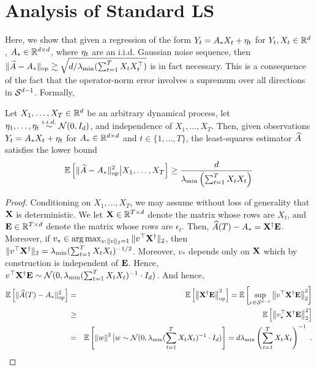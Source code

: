 \section{Analysis of Standard LS\label{app:op_norm_ls}}
Here, we show that given a regression of the form $Y_t = A_{*} X_t + \eta_t$ for $Y_t,X_t \in \mathbb{R}^d$, $A_{*} \in \mathbb{R}^{d \times d}$, where $\eta_t$ are an i.i.d. Gaussian noise sequence, then $\|\widehat{A} - A_{*}\|_{\mathrm{op}} \gtrsim \sqrt{d/ \lambda_{\min}(\sum_{t=1}^T X_tX_t^\top)}$ is in fact necessary. This is a consequence of the fact that the operator-norm error involves a supremum over all directions in $\mathcal{S}^{d-1}$. Formally,
\begin{thm}\label{thm:alg_spec_lb} Let $X_1,\dots,X_T \in \mathbb{R}^d$ be an arbitrary dynamical process, let $\eta_1,\dots,\eta_t \overset{i.i.d.}{\sim} \mathcal{N}(0,I_d)$, and independence of $X_1,\dots,X_T$. Then, given observations $Y_t = A_{*} X_t + \eta_t$ for $A_{*} \in \mathbb{R}^{d\times d}$ and $t \in \{1,\dots,T\}$, the least-squares estimator $\widehat{A}$ satisfies the lower bound
\begin{eqnarray*}
\mathbb{E}\left[\|\widehat{A} - A_*\|_{\mathrm{op}}^2 \big{|} X_1,\dots,X_T\right] \ge  \frac{d}{\lambda_{\min}\left(\sum_{t=1}^T X_tX_t\right)}
\end{eqnarray*}
\end{thm}
\begin{proof} Conditioning on $X_1,\dots,X_T$, we may assume without loss of generality that $\mathbf{X}$ is deterministic. We let
	$\mathbf{X} \in \mathbb{R}^{T \times d}$ denote the matrix whose rows are $X_t$, and $\mathbf{E} \in \mathbb{R}^{T \times d}$ denote the matrix
	whose rows are $\epsilon_t$. Then, $\widehat{A}(T) - A_* = \mathbf{X}^{\dagger} \mathbf{E}
	$. Moreover, if $v_* \in \arg\max_{v: \|v\|_2 = 1}\|v^{\top}\mathbf{X}^{\dagger}\|_2$, then $\|v^{\top}\mathbf{X}^{\dagger}\|_2 = \lambda_{\min}(\sum_{t=1}^T X_tX_t)^{-1/2}$. Moreover, $v_*$ depends only on $\mathbf{X}$ which by construction is independent of $\mathbf{E}$. Hence, $v^{\top}\mathbf{X}^{\dagger}\mathbf{E} \sim \mathcal{N}(0,\lambda_{\min}(\sum_{t=1}^T X_tX_t)^{-1} \cdot I_d) $. And hence,
	\begin{eqnarray*}
	\mathbb{E}\left[\|\widehat{A}(T) - A_*\|_{\mathrm{op}}^2\right] &=& \mathbb{E}\left[\left\|\mathbf{X}^{\dagger} \mathbf{E}\right\|_{\mathrm{op}}^2\right] = \mathbb{E}\left[\sup_{v \in \mathcal{S}^{d-1}} \left\|v^{\top}\mathbf{X}^{\dagger} \mathbf{E}\right\|_2^2\right] \\
	&\ge& \mathbb{E}\left[ \left\|v_*^{\top}\mathbf{X}^{\dagger} \mathbf{E}\right\|_2^2\right] \\
	&=& \mathbb{E}\left[\left\|w\right\|^2 \big{|} w \sim \mathcal{N}(0,\lambda_{\min}(\sum_{t=1}^T X_tX_t)^{-1} \cdot I_d)\right] = d\lambda_{\min}\left(\sum_{t=1}^T X_tX_t\right)^{-1}~.
	\end{eqnarray*}
\end{proof}